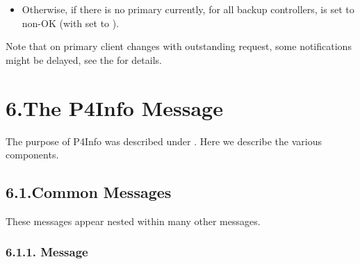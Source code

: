 \documentclass[11pt]{article}
\begin{document}
{\begin{itemize}
\begin{itemize}
\item{}
Otherwise, if there is no primary currently, for all backup controllers,
 is set to non-OK (with  set to
).%
\end{itemize}%
\end{itemize}%

\noindent{}Note that on primary client changes with outstanding  request, some
notifications might be delayed, see the
 for details.%

\section{6.\hspace*{0.5em}The P4Info Message}\label{sec-the-p4info-message}%

\noindent{}The purpose of P4Info was described under
.
Here we describe the various
components.%

\subsection{6.1.\hspace*{0.5em}Common Messages}\label{sec-common-messages}%

\noindent{}These messages appear nested within many other messages.%

\subsubsection{6.1.1.\hspace*{0.5em} Message}\label{sec-documentation-message}%

}
\end{document}
